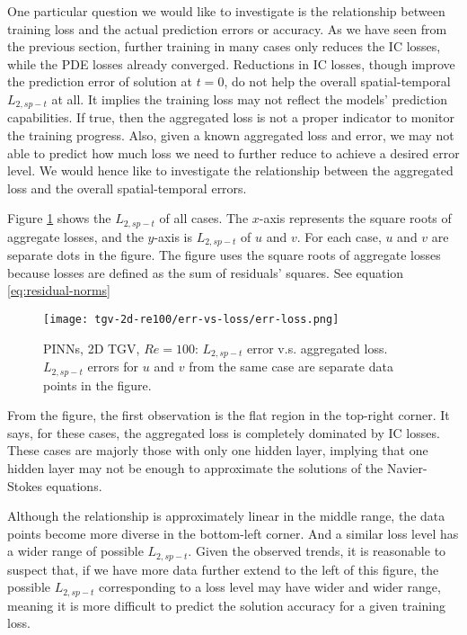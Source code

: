 One particular question we would like to investigate is the relationship between training loss and the actual prediction errors or accuracy.
As we have seen from the previous section, further training in many cases only reduces the IC losses, while the PDE losses already converged.
Reductions in IC losses, though improve the prediction error of solution at $t=0$, do not help the overall spatial-temporal $L_{2,sp-t}$ at all.
It implies the training loss may not reflect the models' prediction capabilities.
If true, then the aggregated loss is not a proper indicator to monitor the training progress.
Also, given a known aggregated loss and error, we may not able to predict how much loss we need to further reduce to achieve a desired error level.
We would hence like to investigate the relationship between the aggregated loss and the overall spatial-temporal errors.

Figure \ref{fig:tgv2d-re100-err-vs-loss} shows the $L_{2,sp-t}$ of all cases.
The $x$-axis represents the square roots of aggregate losses, and the $y$-axis is $L_{2,sp-t}$ of $u$ and $v$.
For each case, $u$ and $v$ are separate dots in the figure.
The figure uses the square roots of aggregate losses because losses are defined as the sum of residuals' squares.
See equation \eqref{eq:residual-norms}

\begin{figure}[hbt!]
    \centering%
    \texttt{[image: tgv-2d-re100/err-vs-loss/err-loss.png]}
    \caption[%
        PINNs, 2D TGV, $Re=100$: $L_{2,sp-t}$ error v.s. aggregated loss%
    ]{%
        PINNs, 2D TGV, $Re=100$: $L_{2,sp-t}$ error v.s. aggregated loss. %
        $L_{2,sp-t}$ errors for $u$ and $v$ from the same case are separate data points in the figure.
    }
    \label{fig:tgv2d-re100-err-vs-loss}
\end{figure}

From the figure, the first observation is the flat region in the top-right corner.
It says, for these cases, the aggregated loss is completely dominated by IC losses.
These cases are majorly those with only one hidden layer, implying that one hidden layer may not be enough to approximate the solutions of the Navier-Stokes equations.

Although the relationship is approximately linear in the middle range, the data points become more diverse in the bottom-left corner.
And a similar loss level has a wider range of possible $L_{2,sp-t}$.
Given the observed trends, it is reasonable to suspect that, if we have more data further extend to the left of this figure, the possible $L_{2,sp-t}$ corresponding to a loss level may have wider and wider range, meaning it is more difficult to predict the solution accuracy for a given training loss.

